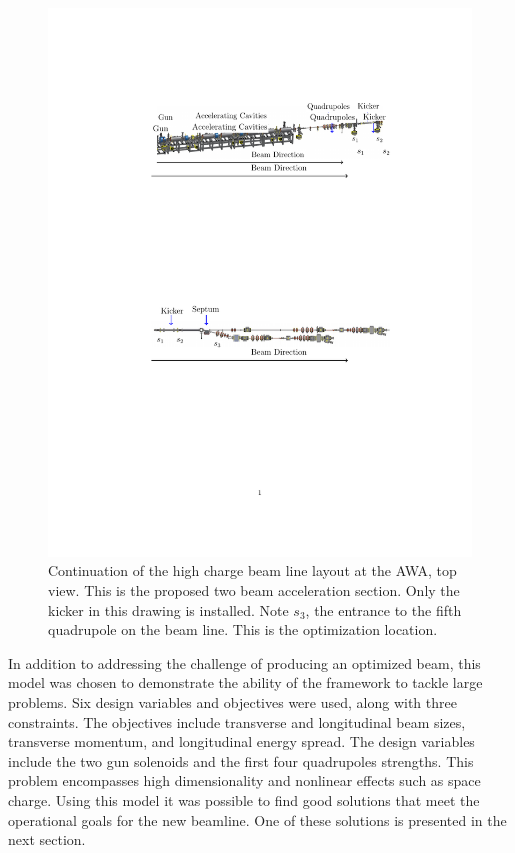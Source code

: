 \begin{figure}
\includegraphics[width=0.9\linewidth]{tba_dogleg2}
	\caption{Continuation of the high charge beam line layout at the AWA, top view. 
		This is the proposed two beam acceleration section. 
		Only the kicker in this drawing is installed. 
	Note $s_3$, the entrance to the fifth quadrupole on the beam line.
	This is the optimization location.}
	\label{awa-tba}
\end{figure}
%

In addition to addressing the challenge of producing an optimized beam, 
this model was chosen to demonstrate the ability of the framework to tackle large problems.
Six design variables and objectives were used, along with three constraints.
The objectives include transverse and longitudinal beam sizes, 
transverse momentum, and longitudinal energy spread. 
The design variables include the two gun solenoids and 
the first four quadrupoles strengths. 
This problem encompasses high dimensionality 
and nonlinear effects such as space charge. 
Using this model it was possible to find good solutions that meet the 
operational goals for the new beamline. One of these solutions is 
presented in the next section.


